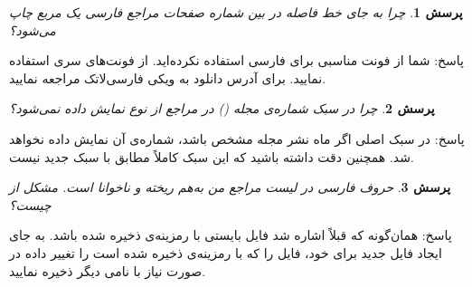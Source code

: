 \documentclass[11pt,a4paper]{article}
\theoremstyle{plain} \newtheorem{question}{پرسش}%
\newcommand{\answer}{{\noindent \Sayeh پاسخ: }}
\begin{document}
\begin{question} چرا به جای خط فاصله در بین شماره صفحات مراجع فارسی یک مربع چاپ می‌شود؟ \end{question}
\answer شما از فونت‌ مناسبی برای فارسی استفاده نکرده‌اید. از فونت‌های سری  استفاده نمایید. برای آدرس دانلود به ویکی فارسی‌لاتک مراجعه نمایید.

\begin{question} چرا در سبک   شماره‌ی مجله () در مراجع از نوع  نمایش داده نمی‌شود؟ \end{question}
\answer در سبک اصلی  اگر ماه نشر مجله مشخص باشد، شماره‌ی آن نمایش داده نخواهد شد.
 همچنین دقت داشته باشید که این سبک کاملاً مطابق با سبک جدید  نیست.

\begin{question} حروف فارسی در لیست مراجع من به‌هم ریخته و ناخوانا است. مشکل از چیست؟ \end{question}
\answer همان‌گونه که قبلاً اشاره شد فایل  بایستی با رمزینه‌ی  ذخیره شده باشد. به جای ایجاد فایل  جدید برای خود، 
فایل  را که با رمزینه‌ی  ذخیره شده است را تغییر داده در صورت نیاز با نامی دیگر ذخیره نمایید. 
\end{document}
